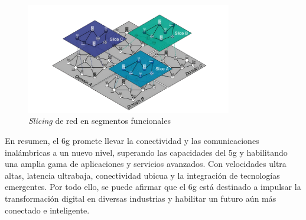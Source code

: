 \begin{figure}[h!]
    \centering
    \includegraphics[width=0.8\textwidth]{archivos/img/teoria/flex.jpg}
    \caption{\textit{Slicing} de red en segmentos funcionales \cite{qin20236g}}
    \label{fig:flex}
\end{figure}



En resumen, el \gls{6g} promete llevar la conectividad y las comunicaciones inalámbricas a un nuevo nivel, superando las capacidades del \gls{5g} y habilitando una amplia gama de aplicaciones y servicios avanzados. Con velocidades ultra altas, latencia ultrabaja, conectividad ubicua y la integración de tecnologías emergentes. Por todo ello, se puede afirmar que el \gls{6g} está destinado a impulsar la transformación digital en diversas industrias y habilitar un futuro aún más conectado e inteligente.

